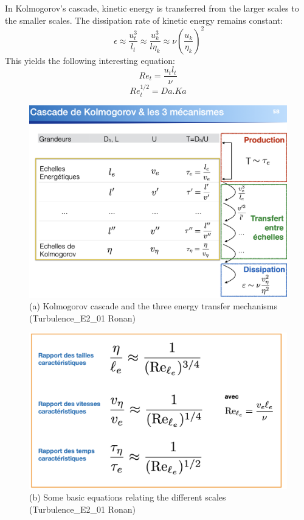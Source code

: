 \documentclass[a4paper,11pt]{article}
\begin{document}
In Kolmogorov's cascade, kinetic energy is transferred from the larger scales to the smaller scales. The dissipation rate of kinetic energy remains constant:
\[\ \epsilon \approx \frac{u_t^3}{l_t} \approx \frac{u_k^3}{l\eta_k} \approx \nu(\frac{u_k}{\eta_k})^2\]
This yields the following interesting equation:
\[ Re_t = \frac{u_t l_t}{\nu} \]
\[ Re_t^{1/2} = Da.Ka \]
\begin{figure}[h!]
	\centering
	\includegraphics[width=.8\linewidth]{figures/cascade.png}
	\caption{(a) Kolmogorov cascade and the three energy transfer mechanisms (Turbulence\_E2\_01 Ronan)}
\end{figure}
\begin{figure}[h!]
	\centering
	\includegraphics[width=.8\linewidth]{figures/relations.png}
	\caption{(b) Some basic equations relating the different scales (Turbulence\_E2\_01 Ronan)}
\end{figure}
\end{document}
